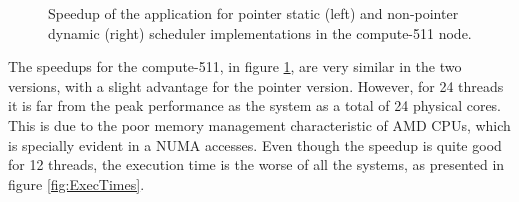 \begin{figure}[!htp]
	\begin{center}
		\caption{Speedup of the \tth application for pointer static (left) and non-pointer dynamic (right) scheduler implementations in the compute-511 node.}
		\label{fig:Speedup511}
	\end{center}
\end{figure}

The speedups for the compute-511, in figure \ref{fig:Speedup511}, are very similar in the two versions, with a slight advantage for the pointer version. However, for 24 threads it is far from the peak performance as the system as a total of 24 physical cores. This is due to the poor memory management characteristic of AMD CPUs, which is specially evident in a NUMA accesses. Even though the speedup is quite good for 12 threads, the execution time is the worse of all the systems, as presented in figure \ref{fig:ExecTimes}.

